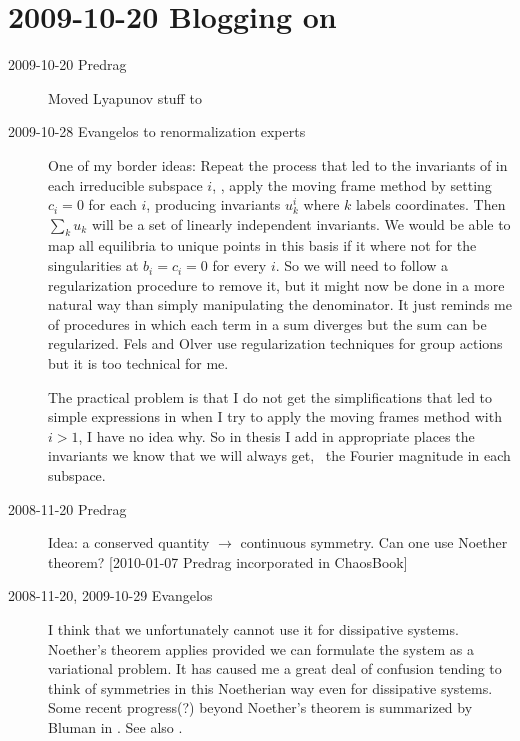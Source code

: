 \section{2009-10-20 Blogging on}

\begin{description}
\item[2009-10-20 Predrag] Moved Lyapunov stuff to

\item[2009-10-28 Evangelos to renormalization experts]

One of my border ideas: Repeat the process that led to the
invariants of  in each irreducible subspace
$i$, \ie, apply the moving frame method by setting $c_i=0$ for
each $i$, producing invariants $u_k^i$ where $k$ labels
coordinates. Then $\sum_k u_k$ will be a set of linearly
independent invariants. We would be able to map all equilibria
to unique points in this basis if it where not for the
singularities at $b_i=c_i=0$ for every $i$. So we will need to
follow a regularization procedure to remove it, but it might
now be done in a more natural way than simply manipulating the
denominator. It just reminds me of procedures in which each
term in a sum diverges but the sum can be regularized. Fels and
Olver use regularization techniques for group
actions but it is too technical for me.

The practical problem is that I do not get the simplifications
that led to simple expressions in  when I try
to apply the moving frames method with $i>1$, I have no idea
why. So in thesis I add in appropriate places the invariants we
know that we will always get, \ie\ the Fourier magnitude in
each subspace.

\item[2008-11-20 Predrag] Idea: a conserved quantity $\to$
continuous symmetry. Can one use Noether theorem?
[2010-01-07 Predrag incorporated in ChaosBook]

\item[2008-11-20, 2009-10-29  Evangelos] I think that we
unfortunately cannot use it for dissipative systems. Noether's
theorem applies provided we can formulate the system as a
variational problem. It has caused me a great deal of confusion
tending to think of symmetries in this Noetherian way even for
dissipative systems. Some recent progress(?) beyond Noether's
theorem is summarized by Bluman in
. See also .


\end{description}
